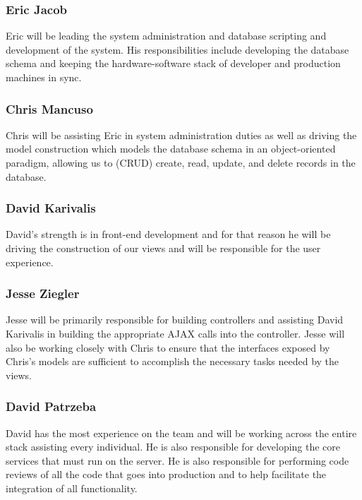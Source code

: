\subsubsection{Eric Jacob}
Eric will be leading the system administration and database scripting and
development of the system.  His responsibilities include developing the database
schema and keeping the hardware-software stack of developer and production
machines in sync.
\subsubsection{Chris Mancuso}
Chris will be assisting Eric in system administration duties as well as driving
the model construction which models the database schema in an object-oriented
paradigm, allowing us to (CRUD) create, read, update, and delete records in the
database.
\subsubsection{David Karivalis}
David's strength is in front-end development and for that reason he will be
driving the construction of our views and will be responsible for the user
experience.
\subsubsection{Jesse Ziegler}
Jesse will be primarily responsible for building controllers and assisting David
Karivalis in building the appropriate AJAX calls into the controller.  Jesse
will also be working closely with Chris to ensure that the interfaces exposed
by Chris's models are sufficient to accomplish the necessary tasks needed by
the views.
\subsubsection{David Patrzeba}
David has the most experience on the team and will be working across the entire
stack assisting every individual.  He is also responsible for developing the
core services that must run on the server. He is also responsible for performing
code reviews of all the code that goes into production and to help facilitate
the integration of all functionality.

